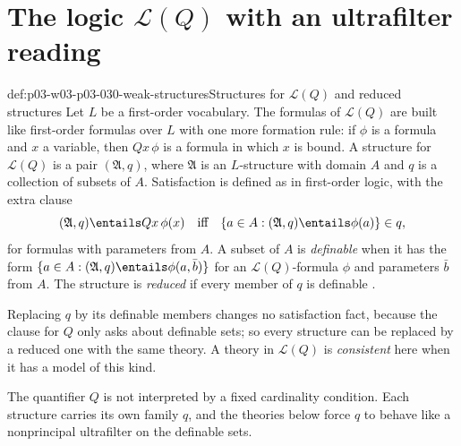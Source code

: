 \section{The logic \texorpdfstring{\(\mathscr L(Q)\)}{L(Q)} with an ultrafilter reading}
\label{sec:p03-w03-p03-030-logic}

\begin{hbdefinition}{def:p03-w03-p03-030-weak-structures}{Structures for \(\mathscr L(Q)\) and reduced structures}
Let \(L\) be a first-order vocabulary.  The formulas of \(\mathscr L(Q)\) are
built like first-order formulas over \(L\) with one more formation rule: if
\(\phi\) is a formula and \(x\) a variable, then \(Qx\,\phi\) is a formula in
which \(x\) is bound.  A structure for \(\mathscr L(Q)\) is a pair
\((\mathfrak A,q)\), where \(\mathfrak A\) is an \(L\)-structure with domain
\(A\) and \(q\) is a collection of subsets of \(A\).  Satisfaction is defined
as in first-order logic, with the extra clause
\[
 (\mathfrak A,q)\entails Qx\,\phi(x)
 \quad\text{iff}\quad
 \{a\in A:(\mathfrak A,q)\entails\phi(a)\}\in q ,
\]
for formulas with parameters from \(A\).  A subset of \(A\) is
\emph{definable} when it has the form
\(\{a\in A:(\mathfrak A,q)\entails\phi(a,\bar b)\}\) for an
\(\mathscr L(Q)\)-formula \(\phi\) and parameters \(\bar b\) from \(A\).
The structure is \emph{reduced} if every member of \(q\) is definable
\cite[p.~203]{Schmerl1985TransferTheorems}.

Replacing \(q\) by its definable members changes no satisfaction fact,
because the clause for \(Q\) only asks about definable sets; so every
structure can be replaced by a reduced one with the same theory.  A theory in
\(\mathscr L(Q)\) is \emph{consistent} here when it has a model of this kind.
\end{hbdefinition}

The quantifier \(Q\) is not interpreted by a fixed cardinality condition.
Each structure carries its own family \(q\), and the theories below force
\(q\) to behave like a nonprincipal ultrafilter on the definable sets.

